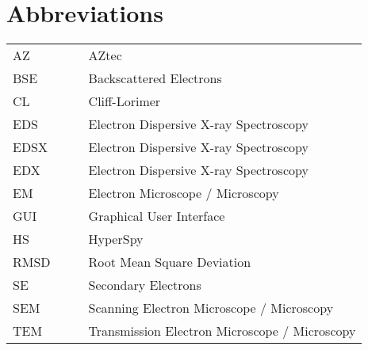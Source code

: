 \chapter*{Abbreviations}

\begin{table}[h!]
    \centering
    \begin{tabular}{llll}
        AZ   &  &  & AZtec                                         \\
        BSE  &  &  & Backscattered Electrons                       \\
        CL   &  &  & Cliff-Lorimer                                 \\
        EDS  &  &  & Electron Dispersive X-ray Spectroscopy        \\
        EDSX &  &  & Electron Dispersive X-ray Spectroscopy        \\
        EDX  &  &  & Electron Dispersive X-ray Spectroscopy        \\
        EM   &  &  & Electron Microscope / Microscopy              \\
        GUI  &  &  & Graphical User Interface                      \\
        HS   &  &  & HyperSpy                                      \\
        RMSD &  &  & Root Mean Square Deviation                    \\
        SE   &  &  & Secondary Electrons                           \\
        SEM  &  &  & Scanning Electron Microscope / Microscopy     \\
        TEM  &  &  & Transmission Electron Microscope / Microscopy
    \end{tabular}
\end{table}

